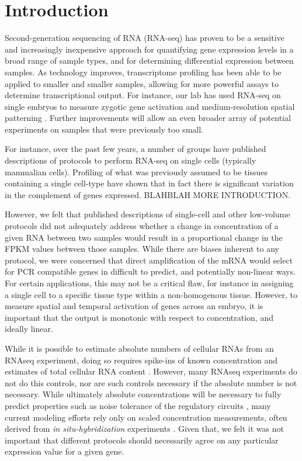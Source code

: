 \section{Introduction}
Second-generation sequencing of RNA (RNA-seq) has proven to be a sensitive and increasingly inexpensive approach for quantifying gene expression levels in a broad range of sample types, and for determining differential expression between samples.  As technology improves, transcriptome profiling has been able to be applied to smaller and smaller samples, allowing for more powerful assays to determine transcriptional output.  For instance, our lab has used RNA-seq on single embryos to measure zygotic gene activation \cite{Lott:2011cc} and medium-resolution spatial patterning \cite{Combs:2013jy}.  Further improvements will allow an even broader array of potential experiments on samples that were previously too small.

For instance, over the past few years, a number of groups have published descriptions of protocols to perform RNA-seq on single cells (typically mammalian cells). Profiling of what was previously assumed to be tissues containing a single cell-type have shown that in fact there is significant variation in the complement of genes expressed. BLAHBLAH MORE INTRODUCTION. 

However, we felt that published descriptions of single-cell and other low-volume protocols did not adequately address whether a change in concentration of a given RNA between two samples would result in a proportional change in the FPKM values between those samples. While there are biases inherent to any protocol, we were concerned that direct amplification of the mRNA would select for PCR compatible genes in difficult to predict, and potentially non-linear ways.  For certain applications, this may not be a critical flaw, for instance in assigning a single cell to a specific tissue type within a non-homogenous tissue.  However, to measure spatial and temporal activation of genes across an embryo, it is important that the output is monotonic with respect to concentration, and ideally linear.


While it is possible to estimate absolute numbers of cellular RNAs from an RNAseq experiment, doing so requires spike-ins of known concentration and estimates of total cellular RNA content \cite{Mortazavi:2008jj}. However, many RNAseq experiments do not do this controls, nor are such controls necessary if the absolute number is not necessary. While ultimately absolute concentrations will be necessary to fully predict properties such as noise tolerance of the regulatory circuits \cite{Gregor:2007du,Gregor:2005jn}, many current modeling efforts rely only on scaled concentration measurements, often derived from {\em in situ-hybridization} experiments \cite{Garcia:2013fs,Ilsley:2013fk,He:2010ix}.  Given that, we felt it was not important that different protocols should necessarily agree on any particular expression value for a given gene.

